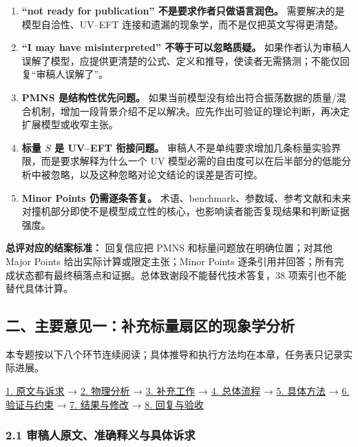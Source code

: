 \documentclass[
]{article}
\providecommand{\tightlist}{%
  \setlength{\itemsep}{0pt}\setlength{\parskip}{0pt}}
\begin{document}
\begin{enumerate}
\def\labelenumi{\arabic{enumi}.}
\tightlist
\item
  \textbf{``not ready for publication'' 不是要求作者只做语言润色。}
  需要解决的是模型自洽性、UV--EFT
  连接和遗漏的现象学，而不是仅把英文写得更清楚。
\item
  \textbf{``I may have misinterpreted'' 不等于可以忽略质疑。}
  如果作者认为审稿人误解了模型，应提供更清楚的公式、定义和推导，使读者无需猜测；不能仅回复``审稿人误解了''。
\item
  \textbf{PMNS 是结构性优先问题。}
  如果当前模型没有给出符合振荡数据的质量/混合机制，增加一段背景介绍不足以解决。应先作出可验证的理论判断，再决定扩展模型或收窄主张。
\item
  \textbf{标量 \(S\) 是 UV--EFT 衔接问题。}
  审稿人不是单纯要求增加几条标量实验界限，而是要求解释为什么一个 UV
  模型必需的自由度可以在后半部分的低能分析中被忽略，以及这种忽略对论文结论的误差是否可控。
\item
  \textbf{Minor Points 仍需逐条答复。}
  术语、benchmark、参数域、参考文献和未来对撞机部分即使不是模型成立性的核心，也影响读者能否复现结果和判断证据强度。
\end{enumerate}

\textbf{总评对应的结案标准：} 回复信应把 PMNS
和标量问题放在明确位置；对其他 Major Points
给出实际计算或限定主张；Minor Points
逐条引用并回答；所有完成状态都有最终稿落点和证据。总体致谢段不能替代技术答复，38
项索引也不能替代具体计算。

\subsection{二、主要意见一：补充标量扇区的现象学分析}\label{ux4e8cux4e3bux8981ux610fux89c1ux4e00ux8865ux5145ux6807ux91cfux6247ux533aux7684ux73b0ux8c61ux5b66ux5206ux6790}

本专题按以下八个环节连续阅读；具体推导和执行方法均在本章，任务表只记录实际进展。

\hyperref[major-1-step-1]{1. 原文与诉求} → \hyperref[major-1-step-2]{2.
物理分析} → \hyperref[major-1-step-3]{3. 补充工作} →
\hyperref[major-1-step-4]{4. 总体流程} → \hyperref[major-1-step-5]{5.
具体方法} → \hyperref[major-1-step-6]{6. 验证与约束} →
\hyperref[major-1-step-7]{7. 结果与修改} → \hyperref[major-1-step-8]{8.
回复与验收}

\subsubsection{2.1
审稿人原文、准确释义与具体诉求}\label{ux5ba1ux7a3fux4ebaux539fux6587ux51c6ux786eux91caux4e49ux4e0eux5177ux4f53ux8bc9ux6c42}
\end{document}
